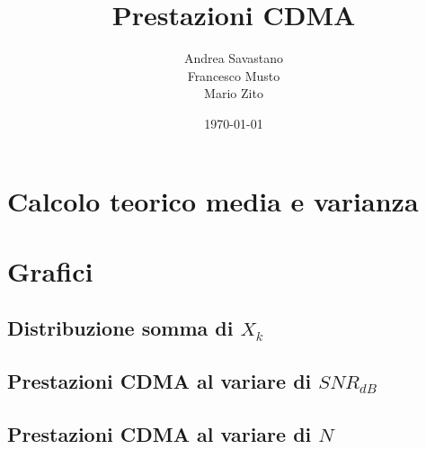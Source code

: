 \documentclass[12pt, a4paper]{article}
\title{Prestazioni CDMA}
\author{Andrea Savastano \\Francesco Musto \\Mario Zito}
\date{\today}
\newcommand{\disablelinkcolor}{%
	\hypersetup{linkcolor=black}%
}
\begin{document}
	\disablelinkcolor	
	\maketitle
	\tableofcontents
	
	\newpage
	\thispagestyle{fancy}
	\section{Calcolo teorico media e varianza}
	
	
	\newpage
	\fancyfoot{} %
	\section{Grafici}
	\subsection{Distribuzione somma di \(X_k\)}
	
	
	\newpage
	\subsection{Prestazioni CDMA al variare di \(SNR_{dB}\)}
	
	
	\newpage
	\subsection{Prestazioni CDMA al variare di \(N\)}
	
	
\end{document}
